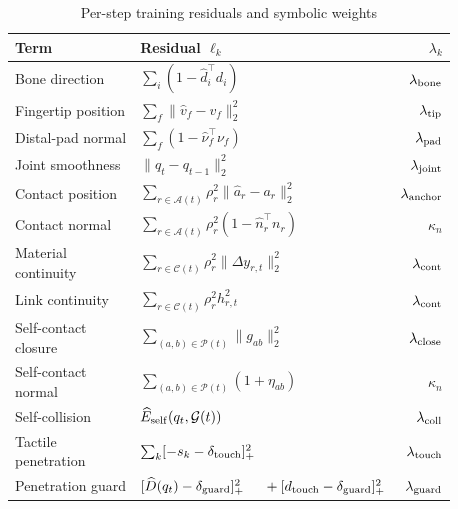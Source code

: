 \begin{table}[t]
\caption{Per-step training residuals and symbolic weights}
\label{tab:cart-loss}
\centering
\footnotesize
\setlength{\tabcolsep}{2pt}
\renewcommand{\arraystretch}{1.15}
\begin{tabular}{@{}p{}p{}r@{}}
\hline
Term & Residual $\ell_k$ & $\lambda_k$ \\
\hline
Bone direction & $\sum_i(1-\hat d_i^\top d_i)$ & $\lambda_{\rm bone}$ \\
Fingertip position & $\sum_f\|\hat v_f-v_f\|_2^2$ & $\lambda_{\rm tip}$ \\
Distal-pad normal & $\sum_f(1-\hat\nu_f^\top\nu_f)$ & $\lambda_{\rm pad}$ \\
Joint smoothness & $\|q_t-q_{t-1}\|_2^2$ & $\lambda_{\rm joint}$ \\
Contact position & $\sum_{r\in\mathcal A(t)}\rho_r^2\|\hat a_r-a_r\|_2^2$ & $\lambda_{\rm anchor}$ \\
Contact normal & $\sum_{r\in\mathcal A(t)}\rho_r^2(1-\hat n_r^\top n_r)$ & $\kappa_n$ \\
\shortstack[l]{Material\\continuity} & $\sum_{r\in\mathcal C(t)}\rho_r^2\|\Delta y_{r,t}\|_2^2$ & $\lambda_{\rm cont}$ \\
Link continuity & $\sum_{r\in\mathcal C(t)}\rho_r^2 h_{r,t}^2$ & $\lambda_{\rm cont}$ \\
\shortstack[l]{Self-contact\\closure} & $\sum_{(a,b)\in\mathcal P(t)}\|g_{ab}\|_2^2$ & $\lambda_{\rm close}$ \\
\shortstack[l]{Self-contact\\normal} & $\sum_{(a,b)\in\mathcal P(t)}(1+\eta_{ab})$ & $\kappa_n$ \\
Self-collision & $\widehat E_{\rm self}(q_t,\mathcal G(t))$ & $\lambda_{\rm coll}$ \\
\shortstack[l]{Tactile\\penetration} & $\sum_k[-s_k-\delta_{\rm touch}]_+^2$ & $\lambda_{\rm touch}$ \\
Penetration guard & \shortstack[l]{$[\widehat D(q_t)-\delta_{\rm guard}]_+^2$\\$\quad{}+[d_{\rm touch}-\delta_{\rm guard}]_+^2$} & $\lambda_{\rm guard}$ \\
\hline
\end{tabular}
\end{table}

